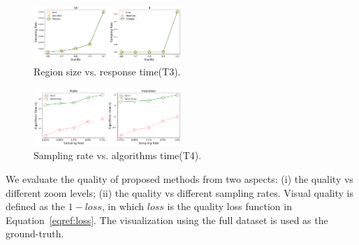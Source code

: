 \begin{figure}[t]
	\centering
	\includegraphics[width=0.5\textwidth]{pictures/quantitative_study_icde/quality_rate.png}
	\vspace{-8mm}
	\caption{Region size vs. response time(T3).}
	\label{fig:quality_rate}
	\vspace{-3mm}
\end{figure}

\begin{figure}[t]
	\centering
	\includegraphics[width=0.5\textwidth]{pictures/quantitative_study_icde/rate_algtime.png}
	\vspace{-8mm}
	\caption{Sampling rate vs. algorithms time(T4).}
	\label{fig:rate_algtime}
	\vspace{-3mm}
\end{figure}


We evaluate the quality of proposed methods from two aspects: (i) the quality vs different zoom levels; (ii) the quality vs different sampling rates.
Visual quality is defined as the $1-loss$, in which $loss$ is the quality loss function in Equation~\eqref{eqref:loss}. The visualization using the full dataset is used as the ground-truth. 


